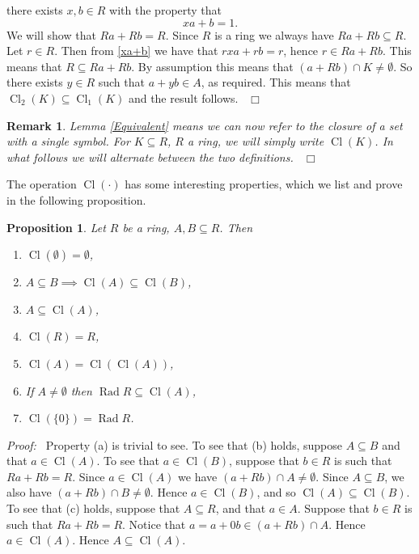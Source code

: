 \documentclass[12pt, oneside]{book}
\newtheorem{proposition}[theorem]{Proposition}
\newtheorem{remark}[theorem]{Remark}
\newcommand{\proof}{{\noindent \it Proof:~}}
\newcommand{\qed}{\hfill ~$\Box$\\}
\def\Rad{\operatorname{Rad}}
\def\Cl{\operatorname{Cl}}
\begin{document}
there exists $x, b \in R$ with the property that 
\begin{equation} \label{xa+b}
xa + b = 1. 
\end{equation}
We will show that $Ra + Rb = R.$ Since $R$ is a ring we always have $Ra + Rb \subseteq R$. 
Let $r \in R$. Then from \eqref{xa+b} we have that $rxa + rb = r$, hence $r \in Ra + Rb$. 
This means that $R \subseteq Ra + Rb$. By assumption this means that 
$(a + Rb) \cap K \neq \emptyset.$ So there exists $y \in R$ such that $a + yb \in A$, as required. 
This means that $\Cl_2(K) \subseteq \Cl_1(K)$ and the result follows.
\qed
\begin{remark}
\normalfont
\noindent Lemma \ref{Equivalent} means we can now refer to the closure of a set with a 
single symbol. For $K \subseteq R$, $R$ a ring, we will simply write $\Cl(K)$. 
In what follows we will alternate between the two definitions.
\qed
\end{remark}
\noindent The operation $\Cl(\cdot)$ has some interesting properties, which we list and prove 
in the following proposition. 
\begin{proposition}
\normalfont
Let $R$ be a ring, $A, B \subseteq R$. Then
\begin{enumerate}[label=(\alph*)]
\item $\Cl(\emptyset) = \emptyset$,
\item $A \subseteq B \implies \Cl(A) \subseteq \Cl(B)$,
\item $A \subseteq \Cl(A)$,
\item $\Cl(R) = R$,
\item $\Cl(A) = \Cl(\Cl(A))$,
\item If $A \neq \emptyset$ then $\Rad R \subseteq \Cl(A)$,
\item $\Cl(\{0\}) = \Rad R$.
\end{enumerate}
\end{proposition}
\proof \space
\noindent Property (a) is trivial to see. 
\vskip 0.3cm
\noindent To see that (b) holds, suppose $A \subseteq B$ and that $a \in \Cl(A)$. To see that
$a \in \Cl(B)$, suppose that $b \in R$ is such that $Ra + Rb = R$. Since $a \in \Cl(A)$ we have 
$(a + Rb) \cap A \neq \emptyset.$ Since $A \subseteq B$, 
we also have $(a + Rb) \cap B \neq \emptyset$. Hence $a \in \Cl(B)$, and so 
$\Cl(A) \subseteq \Cl(B)$.
\vskip 0.3cm
\noindent To see that (c) holds, suppose that $A \subseteq R$, and that $a \in A$. 
Suppose that $b \in R$ is such that $Ra + Rb = R$. Notice that 
$a = a + 0b \in (a + Rb) \cap A$. Hence $a \in \Cl(A)$. Hence $A \subseteq \Cl(A)$.
\end{document}
